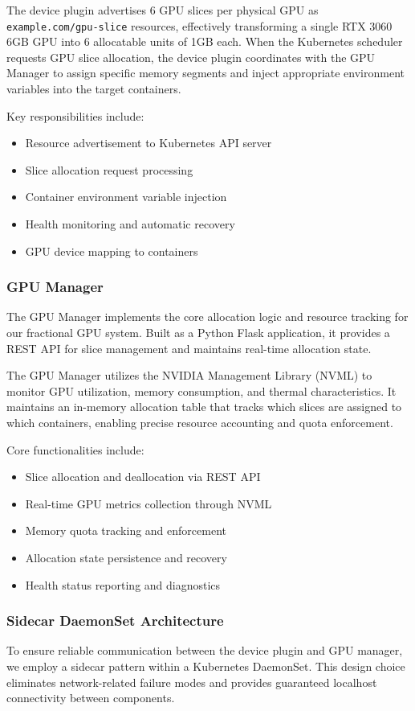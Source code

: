 \documentclass[10pt,twocolumn,letterpaper]{article}
\begin{document}
The device plugin advertises 6 GPU slices per physical GPU as \texttt{example.com/gpu-slice} resources, effectively transforming a single RTX 3060 6GB GPU into 6 allocatable units of 1GB each. When the Kubernetes scheduler requests GPU slice allocation, the device plugin coordinates with the GPU Manager to assign specific memory segments and inject appropriate environment variables into the target containers.

Key responsibilities include:
\begin{itemize}
\item Resource advertisement to Kubernetes API server
\item Slice allocation request processing
\item Container environment variable injection
\item Health monitoring and automatic recovery
\item GPU device mapping to containers
\end{itemize}

\subsubsection{GPU Manager}
The GPU Manager implements the core allocation logic and resource tracking for our fractional GPU system. Built as a Python Flask application, it provides a REST API for slice management and maintains real-time allocation state.

The GPU Manager utilizes the NVIDIA Management Library (NVML) to monitor GPU utilization, memory consumption, and thermal characteristics. It maintains an in-memory allocation table that tracks which slices are assigned to which containers, enabling precise resource accounting and quota enforcement.

Core functionalities include:
\begin{itemize}
\item Slice allocation and deallocation via REST API
\item Real-time GPU metrics collection through NVML
\item Memory quota tracking and enforcement
\item Allocation state persistence and recovery
\item Health status reporting and diagnostics
\end{itemize}

\subsubsection{Sidecar DaemonSet Architecture}
To ensure reliable communication between the device plugin and GPU manager, we employ a sidecar pattern within a Kubernetes DaemonSet. This design choice eliminates network-related failure modes and provides guaranteed localhost connectivity between components.
\end{document}
